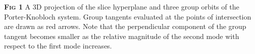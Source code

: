 \color{black}
{\small
\textbf{\textsc{Fig 1}} A 3D projection of the slice hyperplane and three
group orbits of the Porter-Knobloch system. Group tangents evaluated at the
points of intersection are drawn as red arrows. Note that the perpendicular
component of the group tangent becomes smaller as the relative magnitude of 
the second mode with respect to the first mode increases.}
